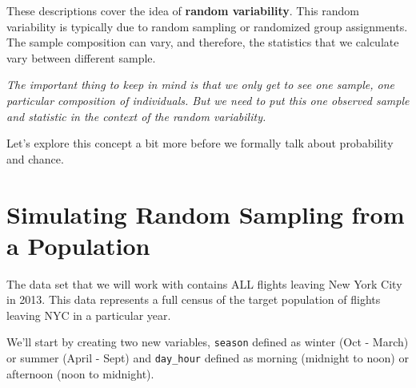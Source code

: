 \documentclass[
]{book}
\newenvironment{Shaded}{\begin{snugshade}}{\end{snugshade}}
\newcommand{\DataTypeTok}[1]{\textcolor[rgb]{0.13,0.29,0.53}{#1}}
\newcommand{\DecValTok}[1]{\textcolor[rgb]{0.00,0.00,0.81}{#1}}
\newcommand{\KeywordTok}[1]{\textcolor[rgb]{0.13,0.29,0.53}{\textbf{#1}}}
\newcommand{\NormalTok}[1]{#1}
\newcommand{\OperatorTok}[1]{\textcolor[rgb]{0.81,0.36,0.00}{\textbf{#1}}}
\newcommand{\StringTok}[1]{\textcolor[rgb]{0.31,0.60,0.02}{#1}}
\begin{document}
These descriptions cover the idea of \textbf{random variability}. This random variability is typically due to random sampling or randomized group assignments. The sample composition can vary, and therefore, the statistics that we calculate vary between different sample.

\emph{The important thing to keep in mind is that we only get to see one sample, one particular composition of individuals. But we need to put this one observed sample and statistic in the context of the random variability.}

Let's explore this concept a bit more before we formally talk about probability and chance.

\hypertarget{simulating-random-sampling-from-a-population}{%
\section{Simulating Random Sampling from a Population}\label{simulating-random-sampling-from-a-population}}

The data set that we will work with contains ALL flights leaving New York City in 2013. This data represents a full census of the target population of flights leaving NYC in a particular year.

We'll start by creating two new variables, \texttt{season} defined as winter (Oct - March) or summer (April - Sept) and \texttt{day\_hour} defined as morning (midnight to noon) or afternoon (noon to midnight).

\begin{Shaded}
\end{Shaded}
\end{document}
